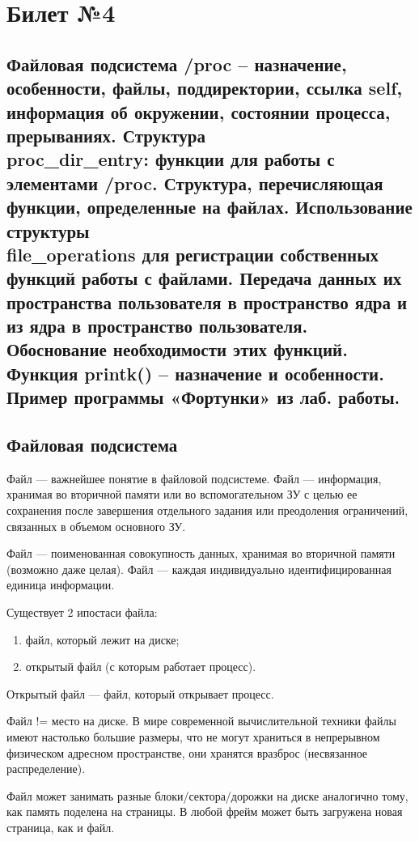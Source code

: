 \chapter{Билет №4}

\section*{Файловая подсистема /proc – назначение, особенности, файлы, поддиректории, ссылка self, информация об окружении, состоянии процесса, прерываниях. Структура \\ proc\_dir\_entry: функции для работы с элементами /proc. Структура, перечисляющая функции, определенные на файлах. Использование структуры \\ file\_operations для регистрации собственных функций работы с файлами. Передача данных их пространства пользователя в пространство ядра и из ядра в пространство пользователя. Обоснование необходимости этих функций. \\ Функция printk() – назначение и особенности. Пример программы «Фортунки» из лаб. работы.}

\section{Файловая подсистема}
Файл --- важнейшее понятие в файловой подсистеме. Файл --- информация, хранимая во вторичной памяти или во вспомогательном ЗУ с целью ее сохранения после завершения отдельного задания или преодоления ограничений, связанных в объемом основного ЗУ.

Файл --- поименованная совокупность данных, хранимая во вторичной памяти (возможно даже целая). Файл --- каждая индивидуально идентифицированная единица информации.

Существует 2 ипостаси файла:
\begin{enumerate}
	\item файл, который лежит на диске;
	\item открытый файл (с которым работает процесс).
\end{enumerate}

Открытый файл --- файл, который открывает процесс.

Файл != место на диске. В мире современной вычислительной техники файлы имеют настолько большие размеры, что не могут храниться в непрерывном физическом адресном пространстве, они хранятся вразброс (несвязанное распределение).

Файл может занимать разные блоки/сектора/дорожки на диске аналогично тому, как память поделена на страницы. В любой фрейм может быть загружена новая страница, как и файл. 

